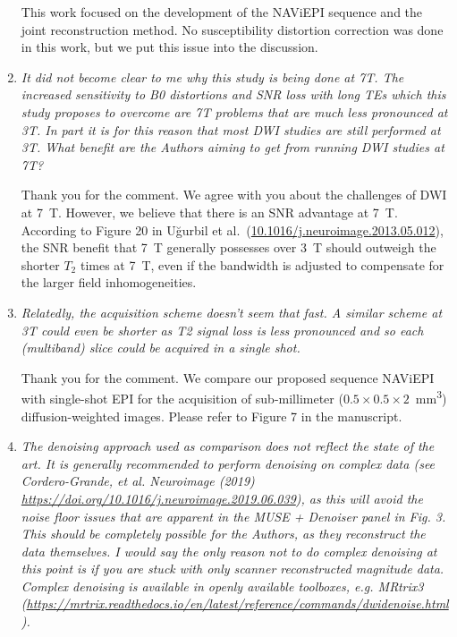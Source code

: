 \documentclass[a4paper,11pt,twoside]{report}
\begin{document}
\begin{enumerate}
    \hspace{1em} This work focused on the development of
    the NAViEPI sequence and
    the joint reconstruction method.
    No susceptibility distortion correction was done in this work,
    but we put this issue into the discussion.


    \item \textit{It did not become clear to me why this study is being done at 7T. The increased sensitivity to B0 distortions and SNR loss with long TEs which this study proposes to overcome are 7T problems that are much less pronounced at 3T. In part it is for this reason that most DWI studies are still performed at 3T. What benefit are the Authors aiming to get from running DWI studies at 7T?}

    \hspace{1em} Thank you for the comment.
    We agree with you about the challenges of DWI at 7~T.
    However, we believe that there is an SNR advantage at 7~T.
    According to Figure 20 in U\u{g}urbil et al.~(\href{https://doi.org/10.1016/j.neuroimage.2013.05.012}{10.1016/j.neuroimage.2013.05.012}),
    the SNR benefit that 7~T generally possesses over 3~T
    should outweigh the shorter $T_2$ times at 7~T,
    even if the bandwidth is adjusted to compensate
    for the larger field inhomogeneities.


    \item \textit{Relatedly, the acquisition scheme doesn't seem that fast. A similar scheme at 3T could even be shorter as T2 signal loss is less pronounced and so each (multiband) slice could be acquired in a single shot.}

    \hspace{1em} Thank you for the comment.
    We compare our proposed sequence NAViEPI with single-shot EPI
    for the acquisition of sub-millimeter
    ($0.5 \times 0.5 \times 2$~\si{mm^3}) diffusion-weighted images.
    Please refer to Figure 7 in the manuscript.

    \item \textit{The denoising approach used as comparison does not reflect the state of the art. It is generally recommended to perform denoising on complex data (see Cordero-Grande, et al. Neuroimage (2019) \url{https://doi.org/10.1016/j.neuroimage.2019.06.039}), as this will avoid the noise floor issues that are apparent in the MUSE + Denoiser panel in Fig. 3. This should be completely possible for the Authors, as they reconstruct the data themselves. I would say the only reason not to do complex denoising at this point is if you are stuck with only scanner reconstructed magnitude data. Complex denoising is available in openly available toolboxes, e.g. MRtrix3 (\url{https://mrtrix.readthedocs.io/en/latest/reference/commands/dwidenoise.html}).}


\end{enumerate}
\end{document}
